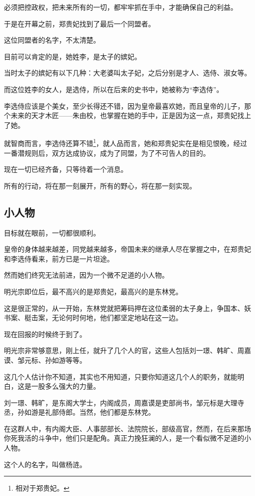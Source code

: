 \begin{multicols}{\theparacolNo}
必须把控政权，把未来所有的一切，都牢牢抓在手中，才能确保自己的利益。

于是在开幕之前，郑贵妃找到了最后一个同盟者。

这位同盟者的名字，不太清楚。

目前可以肯定的是，她姓李，是太子的嫔妃。

当时太子的嫔妃有以下几种：大老婆叫太子妃，之后分别是才人、选侍、淑女等。

而这位姓李的女人，是选侍，所以在后来的史书中，她被称为“李选侍”。

李选侍应该是个美女，至少长得还不错，因为皇帝最喜欢她，而且皇帝的儿子，那个未来的天才木匠——朱由校，也掌握在她的手中，正是因为这一点，郑贵妃找上了她。

就智商而言，李选侍还算不错\footnote{相对于郑贵妃。}，就人品而言，她和郑贵妃实在是相见恨晚，经过一番潜规则后，双方达成协议，成为了同盟，为了不可告人的目的。

现在一切已经齐备，只等待着一个消息。

所有的行动，将在那一刻展开，所有的野心，将在那一刻实现。

\subsection{小人物}
目标就在眼前，一切都很顺利。

皇帝的身体越来越差，同党越来越多，帝国未来的继承人尽在掌握之中，在郑贵妃和李选侍看来，前方已是一片坦途。

然而她们终究无法前进，因为一个微不足道的小人物。

明光宗即位后，最不高兴的是郑贵妃，最高兴的是东林党。

这是很正常的，从一开始，东林党就把筹码押在这位柔弱的太子身上，争国本、妖书案、梃击案，无论何时何地，他们都坚定地站在这一边。

现在回报的时候终于到了。

明光宗非常够意思，刚上任，就升了几个人的官，这些人包括刘一璟、韩旷、周嘉谟、邹元标、孙如游等等。

这几个人估计你不知道，其实也不用知道，只要你知道这几个人的职务，就能明白，这是一股多么强大的力量。

刘一璟、韩旷，是东阁大学士，内阁成员，周嘉谟是吏部尚书，邹元标是大理寺丞，孙如游是礼部侍郎。当然，他们都是东林党。

在这群人中，有内阁大臣、人事部部长、法院院长，部级高官，然而，在后来那场你死我活的斗争中，他们只是配角。真正力挽狂澜的人，是一个看似微不足道的小人物。

这个人的名字，叫做杨涟。


\end{multicols}
